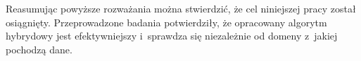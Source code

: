 \documentclass[twoside]{iisthesis}
\begin{document}
	Reasumując powyższe rozważania można stwierdzić, że cel niniejszej pracy został osiągnięty. Przeprowadzone badania potwierdziły, że opracowany algorytm hybrydowy jest efektywniejszy i~sprawdza się niezależnie od domeny z~jakiej pochodzą dane. 

	



\clearpage




\end{document}
